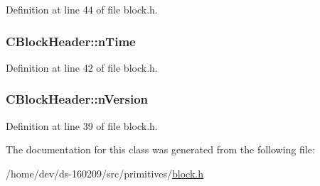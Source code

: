 Definition at line 44 of file block.\+h.

\hypertarget{class_c_block_header_aa435a58a8f13a304681e797366e0d56d}{}
\subsubsection[{n\+Time}]{ C\+Block\+Header\+::n\+Time}\label{class_c_block_header_aa435a58a8f13a304681e797366e0d56d}


Definition at line 42 of file block.\+h.

\hypertarget{class_c_block_header_ad64b7a76914741861f55f0f38ed66fb5}{}
\subsubsection[{n\+Version}]{ C\+Block\+Header\+::n\+Version}\label{class_c_block_header_ad64b7a76914741861f55f0f38ed66fb5}


Definition at line 39 of file block.\+h.



The documentation for this class was generated from the following file\+:\begin{DoxyCompactItemize}
\item 
/home/dev/ds-\/160209/src/primitives/\hyperlink{primitives_2block_8h}{block.\+h}\end{DoxyCompactItemize}
